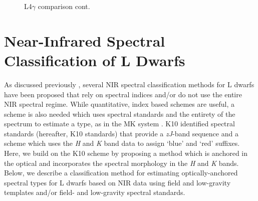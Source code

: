 \documentclass[modern,trackchanges]{aastex61}
\begin{document}
\begin{figure}
     \caption{L4$\gamma$ comparison cont.}
\end{figure}
\clearpage

\section{Near-Infrared Spectral Classification of L Dwarfs}
\label{sec:classification}

As discussed previously
, several NIR spectral classification methods for L dwarfs have been proposed that rely on spectral indices and/or do not use the entire NIR spectral regime.
While quantitative, index based schemes are useful, a scheme is also needed which uses spectral standards and the entirety of the spectrum to estimate a type, as in the MK system \citep{Morgan:1984wy,Cushing:2014un}.
K10 identified spectral standards (hereafter, K10 standards) that provide a \emph{zJ}-band sequence and a scheme which uses the \emph{H} and \emph{K} band data to assign `blue' and `red' suffixes.
Here, we build on the K10 scheme by proposing a method which is anchored in the optical and incorporates the spectral morphology in the \emph{H} and \emph{K} bands.
Below, we describe a classification method for estimating optically-anchored spectral types for L dwarfs based on NIR data using field and low-gravity templates and/or field- and low-gravity spectral standards.
\end{document}
